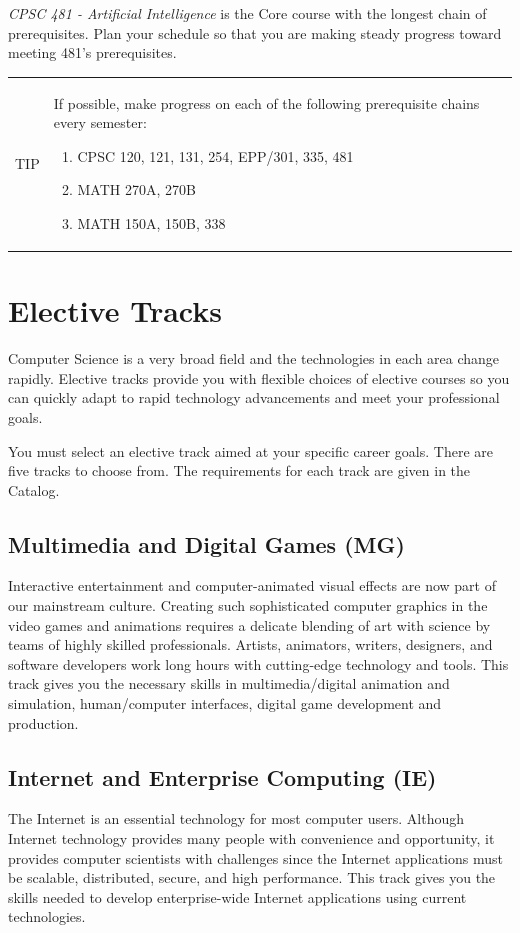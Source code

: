 \documentclass{book}
\newenvironment{tip}
               {\tcolorbox \begin{tabular}{m{.5in} m{5in}} \Large{TIP} & }
               {\end{tabular} \endtcolorbox}
\begin{document}
\emph{CPSC 481 - Artificial Intelligence} is the Core course with the longest chain of prerequisites. Plan your schedule so that you are making steady progress toward meeting 481's prerequisites.

\begin{tip}
  If possible, make progress on each of the following prerequisite chains every semester:
  \begin{enumerate}
  \item CPSC 120, 121, 131, 254, EPP/301, 335, 481
  \item MATH 270A, 270B
  \item MATH 150A, 150B, 338
  \end{enumerate}
\end{tip}

\section{Elective Tracks}
 
Computer Science is a very broad field and the technologies in each area change rapidly. Elective tracks provide you with flexible choices of elective courses so you can quickly adapt to rapid technology advancements and meet your professional goals.

You must select an elective track aimed at your specific career goals. There are five tracks to choose from. The requirements for each track are given in the Catalog.

\subsection{Multimedia and Digital Games (MG)}
Interactive entertainment and computer-animated visual effects are now part of our mainstream culture. Creating such sophisticated computer graphics in the video games and animations requires a delicate blending of art with science by teams of highly skilled professionals. Artists, animators, writers, designers, and software developers work long hours with cutting-edge technology and tools. This track gives you the necessary skills in multimedia/digital animation and simulation, human/computer interfaces, digital game development and production.

\subsection{Internet and Enterprise Computing (IE)}
The Internet is an essential technology for most computer users. Although Internet technology provides many people with convenience and opportunity, it provides computer scientists with challenges since the Internet applications must be scalable, distributed, secure, and high performance. This track gives you the skills needed to develop enterprise-wide Internet applications using current technologies.
\end{document}
